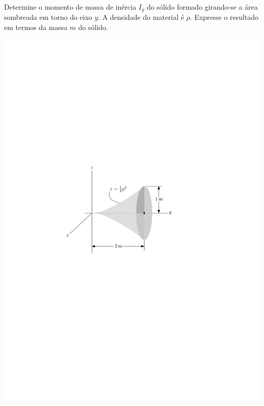 \item Determine o momento de massa de inércia $I_{y}$ do sólido formado girando-se a área sombreada em torno do eixo $y$. A densidade do material é $\rho$. Expresse o resultado em termos da massa $m$ do sólido.

\vspace{-.5cm}
\begin{flushright}
	\includegraphics[scale=1.05]{../../images/draw_2}
\end{flushright}
